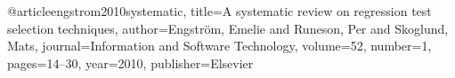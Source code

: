 @article{engstrom2010systematic,
  title={A systematic review on regression test selection techniques},
  author={Engstr{\"o}m, Emelie and Runeson, Per and Skoglund, Mats},
  journal={Information and Software Technology},
  volume={52},
  number={1},
  pages={14--30},
  year={2010},
  publisher={Elsevier}
}